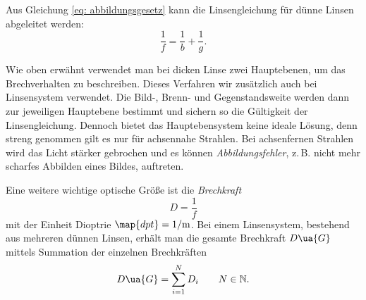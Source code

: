 Aus Gleichung \eqref{eq: abbildungsgesetz} kann die Linsengleichung für dünne Linsen abgeleitet werden:
\begin{equation}
  \label{eq: linsengleichung}
  \frac{1}{f}= \frac{1}{b}+  \frac{1}{g}.
\end{equation}

Wie oben erwähnt verwendet man bei dicken Linse zwei Hauptebenen, um das Brechverhalten
zu beschreiben. Dieses Verfahren wir zusätzlich auch bei Linsensystem verwendet.
Die Bild-, Brenn- und Gegenstandsweite werden dann zur jeweiligen Hauptebene
bestimmt und sichern so die Gültigkeit der Linsengleichung.
Dennoch bietet das Hauptebensystem keine ideale Lösung, denn streng genommen
gilt es nur für achsennahe Strahlen. Bei achsenfernen Strahlen wird das Licht stärker
gebrochen und es können \emph{Abbildungsfehler}, z.\,B. nicht mehr scharfes Abbilden eines Bildes,
auftreten.

Eine weitere wichtige optische Größe ist die \emph{Brechkraft}
\begin{equation}
  \label{eq: brechkraft}
  D=\frac{1}{f}
\end{equation}
mit der Einheit Dioptrie $\map{dpt}=\si{\per \meter}$.
Bei einem Linsensystem, bestehend aus mehreren dünnen Linsen, erhält man die gesamte
Brechkraft $D\ua{G}$ mittels Summation der einzelnen Brechkräften
\begin{equation*}
  D\ua{G}=\sum_{i=1}^{N}D_i \qquad N\in\mathbb{N}.
\end{equation*}
